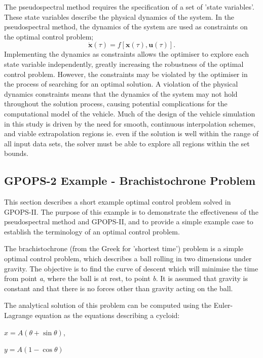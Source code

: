 The pseudospectral method requires the specification of a set of 'state variables'. These state variables describe the physical dynamics of the system. In the pseudospectral method, the dynamics of the system are used as constraints on the optimal control problem;
\begin{equation} \label{eq:state2}
\dot{\textbf{x}}(\tau) = f[\textbf{x}(\tau),\textbf{u}(\tau)].
\end{equation}
Implementing the dynamics as constraints allows the optimiser to explore each state variable independently, greatly increasing the robustness of the optimal control problem. However, the constraints may be violated by the optimiser in the process of searching for an optimal solution. A violation of the physical dynamics constraints means that the dynamics of the system may not hold throughout the solution process, causing potential complications for the computational model of the vehicle. Much of the design of the vehicle simulation in this study is driven by the need for smooth, continuous interpolation schemes, and viable extrapolation regions ie. even if the solution is well within the range of all input data sets, the solver must be able to explore all regions within the set bounds. 

\subsection{GPOPS-2 Example - Brachistochrone Problem}
This section describes a short example optimal control problem solved in GPOPS-II. The purpose of this example is to demonstrate the effectiveness of the pseudospectral method and GPOPS-II, and to provide a simple example case to establish the terminology of an optimal control problem.  


The brachistochrone (from the Greek for 'shortest time') problem is a simple optimal control problem, which describes a ball rolling in two dimensions under gravity. The objective is to find the curve of descent which will minimise the time from point \textit{a}, where the ball is at rest, to point \textit{b}. It is assumed that gravity is constant and that there is no forces other than gravity acting on the ball. 

The analytical solution of this problem can be computed using the Euler-Lagrange equation as the equations describing a cycloid:

$x = A(\theta + \sin\theta) $,

$y=A(1 - \cos\theta)$

